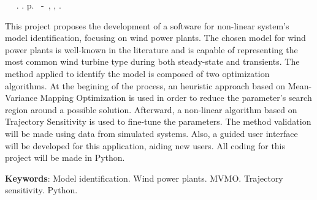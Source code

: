 \begin{resumo}

\begin{flushleft} 
	\setlength{\absparsep}{0pt} %
	\SingleSpacing 
 	\imprimirautorabr~ ~\textbf{\imprimirtitleabstract}.	\imprimirdata.  \pageref{LastPage}p. 
	\imprimirtipotrabalho~-~\imprimirinstituicao, \imprimirlocal, 	\imprimirdata. 
\end{flushleft}

\OnehalfSpacing

This project proposes the development of a software for non-linear system's model identification, focusing on wind power plants. The chosen model  for wind power plants is well-known in the literature and is capable of representing the most common wind turbine type during both steady-state and transients. The method applied to identify the model is composed of two optimization algorithms. At the begining of the process, an heuristic approach based on Mean-Variance Mapping Optimization is used in order to reduce the parameter's search region around a possible solution. Afterward, a non-linear algorithm based on Trajectory Sensitivity is used to fine-tune the parameters. The method validation will be made using data from simulated systems. Also, a guided user interface will be developed for this application, aiding new users. All coding for this project will be made in Python.


\textbf{Keywords}: Model identification. Wind power plants. MVMO. Trajectory sensitivity. Python.

\end{resumo}
